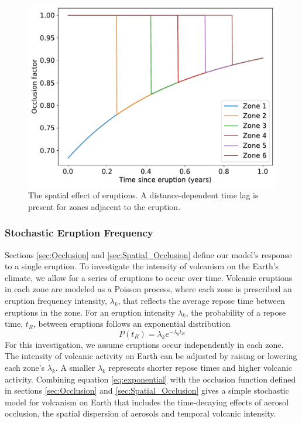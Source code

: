 \documentclass[12pt]{article}
\begin{document}
\begin{figure}[H]
    \centering
    \includegraphics[scale=0.6]{occlusion_space.pdf}
    \caption{
        The spatial effect of eruptions. A distance-dependent time lag is
        present for zones adjacent to the eruption.
    }
    \label{fig:occlusion_space}
\end{figure}
\FloatBarrier

\subsubsection{Stochastic Eruption Frequency} \label{sec:Stochastic}
Sections \ref{sec:Occlusion} and \ref{sec:Spatial_Occlusion} define our model's
response to a single eruption. To investigate the intensity of
volcanism on the Earth's climate, we allow for a series of eruptions to occur
over time. Volcanic eruptions in each zone are modeled as a Poisson
process, where each zone is prescribed an eruption frequency intensity,
$\lambda_k$, that reflects the average repose time between eruptions in the zone.
For an eruption intensity $\lambda_k$, the probability of a repose time, $t_{R}$,
between eruptions follows an exponential distribution
\begin{equation} \label{eq:exponential}
P(t_{R}) = \lambda_k e^{-\lambda_k t_{R}}
\end{equation}
For this investigation, we assume eruptions occur independently in each zone. \\

The intensity of volcanic activity on Earth can be adjusted by raising or
lowering each zone's $\lambda_k$. A smaller $\lambda_k$ represents shorter repose
times and higher volcanic activity. Combining equation \ref{eq:exponential} with
the occlusion function defined in sections \ref{sec:Occlusion} and
\ref{sec:Spatial_Occlusion} gives a simple stochastic model for volcanism on
Earth that includes the time-decaying effects of aerosol occlusion, the spatial
dispersion of aerosols and temporal volcanic intensity.
\end{document}
